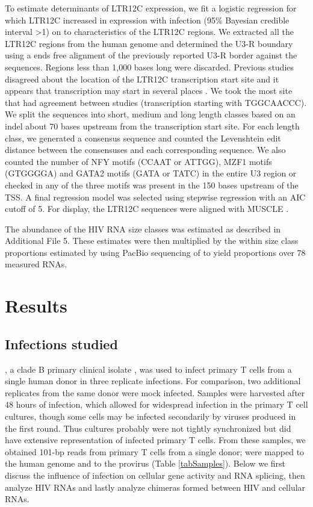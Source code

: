 \documentclass[../sherrill-Mix_thesis.tex]{subfiles}
\begin{document}
		To estimate determinants of LTR12C expression, we fit a logistic regression for which LTR12C increased in expression with \hivEight{} infection (95\% Bayesian credible interval \textgreater{}1) on to characteristics of the LTR12C regions. We extracted all the LTR12C regions from the human genome and determined the U3-R boundary using a ends free alignment of the previously reported U3-R border \citep{LaMantia1991,LaMantia1992,Plant2001,Ling2002,Yu2005} against the sequences. Regions less than 1,000 bases long were discarded. Previous studies disagreed about the location of the LTR12C transcription start site and it appears that transcription may start in several places \citep{LaMantia1992,Plant2001}. We took the \fivePrime{} most site that had agreement between studies (transcription starting with TGGCAACCC). We split the sequences into short, medium and long length classes based on an indel about 70 bases upstream from the transcription start site. For each length class, we generated a consensus sequence and counted the Levenshtein edit distance between the consensuses and each corresponding sequence. We also counted the number of NFY motifs (CCAAT or ATTGG), MZF1 motifs (GTGGGGA) and GATA2 motifs (GATA or TATC) in the entire U3 region or checked in any of the three motifs was present in the 150 bases upstream of the TSS. A final regression model was selected using stepwise regression with an AIC cutoff of 5. For display, the LTR12C sequences were aligned with MUSCLE \citep{Edgar2004}.

		The abundance of the HIV RNA size classes was estimated as described in Additional File 5. These estimates were then multiplied by the within size class proportions estimated by \citet{Ocwieja2012} using PacBio sequencing of \hivEight{} to yield proportions over 78 measured \hivEight{} RNAs.
		

\section{Results}
	\subsection{Infections studied}
		\hivEight{}, a clade B primary clinical isolate \citep{Collman1992}, was used to infect primary \cdFour{} T cells from a single human donor in three replicate infections. For comparison, two additional replicates from the same donor were mock infected. Samples were harvested after 48 hours of infection, which allowed for widespread infection in the primary T cell cultures, though some cells may be infected secondarily by viruses produced in the first round.  Thus cultures probably were not tightly synchronized but did have extensive representation of infected primary T cells. From these samples, we obtained \nReads{} 101-bp reads from primary \cdFour{} T cells from a single donor; \nHuman{} were mapped to the human genome and \nHIV{} to the \hivEight{} provirus (Table \ref{tabSamples}). Below we first discuss the influence of infection on cellular gene activity and RNA splicing, then analyze HIV RNAs and lastly analyze chimeras formed between HIV and cellular RNAs.
\end{document}
